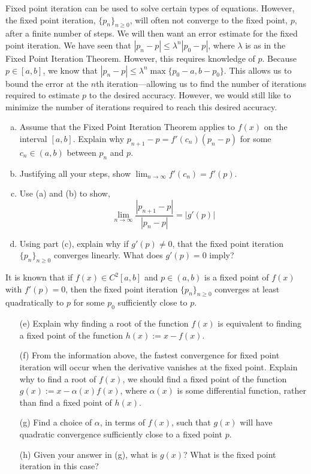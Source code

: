 \documentclass[11pt,letterpaper]{article}
\begin{document}
 Fixed point iteration can be used to solve certain types of equations. However, the fixed point iteration, $\{ p_n \}_{n \geq 0}$, will often not converge to the fixed point, $p$, after a finite number of steps. We will then want an error estimate for the fixed point iteration. We have seen that $|p_n - p| \leq \lambda^n |p_0 - p|$, where $\lambda$ is as in the Fixed Point Iteration Theorem. However, this requires knowledge of $p$. Because $p \in [a, b]$, we know that $|p_n - p| \leq \lambda^n \max\{ p_0 - a, b - p_0 \}$. This allows us to bound the error at the $n$th iteration---allowing us to find the number of iterations required to estimate $p$ to the desired accuracy. However, we would still like to minimize the number of iterations required to reach this desired accuracy.  
	\begin{enumerate}[(a)]
	\item Assume that the Fixed Point Iteration Theorem applies to $f(x)$ on the interval $[a, b]$. Explain why $p_{n+1} - p= f'(c_n)(p_n - p)$ for some $c_n \in (a, b)$ between $p_n$ and $p$. 
	\item Justifying all your steps, show $\displaystyle \lim_{n \to \infty} f'(c_n)= f'(p)$.
	\item Use (a) and (b) to show,
		\[
		\lim_{n \to \infty} \dfrac{|p_{n+1} - p|}{|p_n - p|}= |g'(p)|
		\]
	\item Using part (c), explain why if $g'(p) \neq 0$, that the fixed point iteration $\{ p_n \}_{n \geq 0}$ converges linearly. What does $g'(p)= 0$ imply? 
	\end{enumerate}
It is known that if $f(x) \in C^2[a, b]$ and $p \in (a, b)$ is a fixed point of $f(x)$ with $f'(p)= 0$, then the fixed point iteration $\{ p_n \}_{n \geq 0}$ converges at least quadratically to $p$ for some $p_0$ sufficiently close to $p$. 
	\begin{enumerate}
	\item[(e)] Explain why finding a root of the function $f(x)$ is equivalent to finding a fixed point of the function $h(x):=  x - f(x)$. 
	\item[(f)] From the information above, the fastest convergence for fixed point iteration will occur when the derivative vanishes at the fixed point. Explain why to find a root of $f(x)$, we should find a fixed point of the function $g(x):= x - \alpha(x) f(x)$, where $\alpha(x)$ is some differential function, rather than find a fixed point of $h(x)$. 
	\item[(g)] Find a choice of $\alpha$, in terms of $f(x)$, such that $g(x)$ will have quadratic convergence sufficiently close to a fixed point $p$. 
	\item[(h)] Given your answer in (g), what is $g(x)$? What is the fixed point iteration in this case?
	\end{enumerate}
\end{document}
